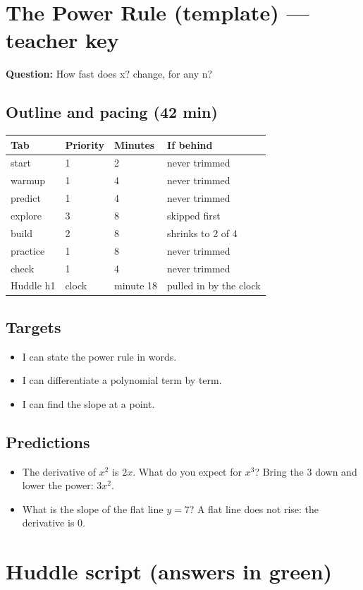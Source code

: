 \documentclass[11pt]{article}
\begin{document}
\section*{The Power Rule (template) --- teacher key}
\textbf{Question:} How fast does x? change, for any n?\par
\subsection*{Outline and pacing (42 min)}\begin{tabular}{@{}llll@{}}\toprule Tab & Priority & Minutes & If behind\\\midrule
start & 1 & 2 & never trimmed\\
warmup & 1 & 4 & never trimmed\\
predict & 1 & 4 & never trimmed\\
explore & 3 & 8 & skipped first\\
build & 2 & 8 & shrinks to 2 of 4\\
practice & 1 & 8 & never trimmed\\
check & 1 & 4 & never trimmed\\
Huddle h1 & clock & minute 18 & pulled in by the clock\\
\bottomrule\end{tabular}
\subsection*{Targets}\begin{itemize}\item I can state the power rule in words.
\item I can differentiate a polynomial term by term.
\item I can find the slope at a point.\end{itemize}
\subsection*{Predictions}\begin{itemize}
\item The derivative of $x^2$ is $2x$. What do you expect for $x^3$?  Bring the 3 down and lower the power: $3x^2$.
\item What is the slope of the flat line $y=7$?  A flat line does not rise: the derivative is 0.
\end{itemize}
\section*{Huddle script (answers in green)}
\end{document}
